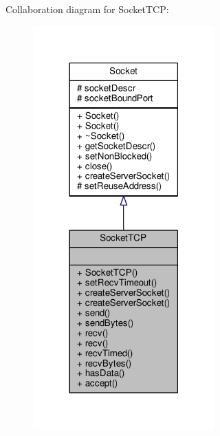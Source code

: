 Collaboration diagram for Socket\-T\-C\-P\-:
\nopagebreak
\begin{figure}[H]
\begin{center}
\leavevmode
\includegraphics[width=198pt]{class_socket_t_c_p__coll__graph}
\end{center}
\end{figure}
